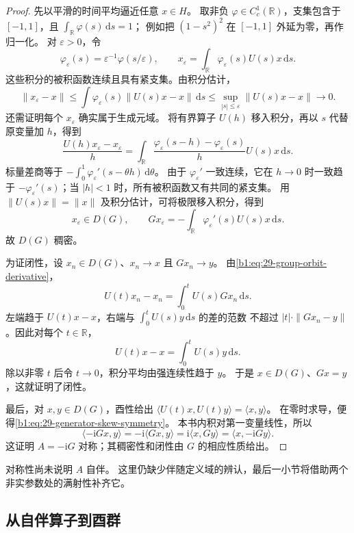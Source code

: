 \begin{proof}
先以平滑的时间平均逼近任意 \(x\in H\)。
取非负 \(\varphi\in C_c^1(\mathbb R)\)，支集包含于 \([-1,1]\)，且
\(\int_{\mathbb R}\varphi(s)\,\mathrm ds=1\)；
例如把 \((1-s^2)^2\) 在 \([-1,1]\) 外延为零，再作归一化。
对 \(\varepsilon>0\)，令
\[
 \varphi_\varepsilon(s)=\varepsilon^{-1}\varphi(s/\varepsilon),\qquad
 x_\varepsilon=\int_{\mathbb R}\varphi_\varepsilon(s)U(s)x\,\mathrm ds.
\]
这些积分的被积函数连续且具有紧支集。由积分估计，
\[
 \|x_\varepsilon-x\|
 \leq\int\varphi_\varepsilon(s)\|U(s)x-x\|\,\mathrm ds
 \leq\sup_{|s|\leq\varepsilon}\|U(s)x-x\|\longrightarrow0.
\]
还需证明每个 \(x_\varepsilon\) 确实属于生成元域。
将有界算子 \(U(h)\) 移入积分，再以 \(s\) 代替原变量加 \(h\)，得到
\[
 \frac{U(h)x_\varepsilon-x_\varepsilon}{h}
 =\int_{\mathbb R}
   \frac{\varphi_\varepsilon(s-h)-\varphi_\varepsilon(s)}{h}
   U(s)x\,\mathrm ds.
\]
标量差商等于
\(-\int_0^1\varphi_\varepsilon'(s-\theta h)\,\mathrm d\theta\)。
由于 \(\varphi_\varepsilon'\) 一致连续，它在 \(h\to0\) 时一致趋于
\(-\varphi_\varepsilon'(s)\)；当 \(|h|<1\) 时，所有被积函数又有共同的紧支集。
用 \(\|U(s)x\|=\|x\|\) 及积分估计，可将极限移入积分，得到
\[
 x_\varepsilon\in D(G),\qquad
 Gx_\varepsilon=-\int_{\mathbb R}\varphi_\varepsilon'(s)U(s)x\,\mathrm ds.
\]
故 \(D(G)\) 稠密。

为证闭性，设 \(x_n\in D(G)\)、\(x_n\to x\) 且 \(Gx_n\to y\)。
由\eqref{b1:eq:29-group-orbit-derivative}，
\[
 U(t)x_n-x_n=\int_0^tU(s)Gx_n\,\mathrm ds.
\]
左端趋于 \(U(t)x-x\)，右端与 \(\int_0^tU(s)y\,\mathrm ds\) 的差的范数
不超过 \(|t|\cdot\|Gx_n-y\|\)。因此对每个 \(t\in\mathbb R\)，
\[
 U(t)x-x=\int_0^tU(s)y\,\mathrm ds.
\]
除以非零 \(t\) 后令 \(t\to0\)，积分平均由强连续性趋于 \(y\)。
于是 \(x\in D(G)\)、\(Gx=y\)，这就证明了闭性。

最后，对 \(x,y\in D(G)\)，酉性给出
\(\langle U(t)x,U(t)y\rangle=\langle x,y\rangle\)。
在零时求导，便得\eqref{b1:eq:29-generator-skew-symmetry}。
本书内积对第一变量线性，所以
\[
 \langle-\mathrm iGx,y\rangle
 =-\mathrm i\langle Gx,y\rangle
 =\mathrm i\langle x,Gy\rangle
 =\langle x,-\mathrm iGy\rangle.
\]
这证明 \(A=-\mathrm iG\) 对称；其稠密性和闭性由 \(G\) 的相应性质给出。
\end{proof}

对称性尚未说明 \(A\) 自伴。
这里仍缺少伴随定义域的辨认，最后一小节将借助两个非实参数处的满射性补齐它。

\subsection{从自伴算子到酉群}
\label{b1:subsec:290803}

